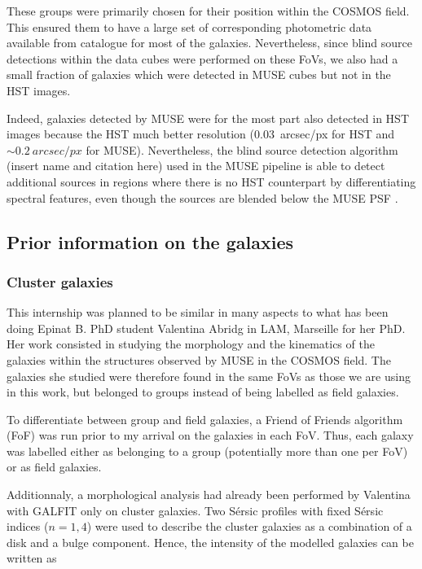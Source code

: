 These groups were primarily chosen for their position within the COSMOS field. This ensured them to have a large set of corresponding photometric data available from  catalogue for most of the galaxies. Nevertheless, since blind source detections within the data cubes were performed on these FoVs, we also had a small fraction of galaxies which were detected in MUSE cubes but not in the HST images. 

Indeed, galaxies detected by MUSE were for the most part also detected in HST images because the HST much better resolution (\SI{0.03}{arcsec/px} for HST and $\sim \SI{0.2}{arcsec/px}$ for MUSE). Nevertheless, the blind source detection algorithm (insert name and citation here) used in the MUSE pipeline is able to detect additional sources in regions where there is no HST counterpart by differentiating spectral features, even though the sources are blended below the MUSE PSF .

\subsection{Prior information on the galaxies}

\subsubsection{Cluster galaxies}

This internship was planned to be similar in many aspects to what has been doing Epinat B. PhD student Valentina Abridg in LAM, Marseille for her PhD. Her work consisted in studying the morphology and the kinematics of the galaxies within the structures observed by MUSE in the COSMOS field. The galaxies she studied were therefore found in the same FoVs as those we are using in this work, but belonged to groups instead of being labelled as field galaxies. 

To differentiate between group and field galaxies, a Friend of Friends algorithm (FoF) was run prior to my arrival on the galaxies in each FoV. Thus, each galaxy was labelled either as belonging to a group (potentially more than one per FoV) or as field galaxies.

Additionnaly, a morphological analysis had already been performed by Valentina with GALFIT only on cluster galaxies. Two Sérsic profiles with fixed Sérsic indices ($n = 1, 4$) were used to describe the cluster galaxies as a combination of a disk and a bulge component. Hence, the intensity of the modelled galaxies can be written as

